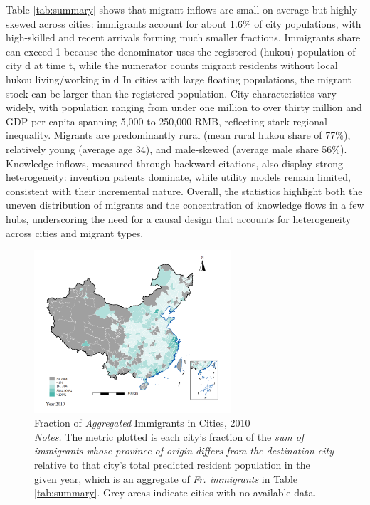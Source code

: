 \documentclass[12pt]{article}
\begin{document}
Table \ref{tab:summary} shows that migrant inflows are small on average but highly skewed across cities: immigrants account for about 1.6\% of city populations, with high-skilled and recent arrivals forming much smaller fractions. 
Immigrants share can exceed 1 because the denominator uses the registered (hukou) population of city d at time t, while the numerator counts migrant residents without local hukou living/working in d In cities with large floating populations, the migrant stock can be larger than the registered population.
City characteristics vary widely, with population ranging from under one million to over thirty million and GDP per capita spanning 5,000 to 250,000 RMB, reflecting stark regional inequality. Migrants are predominantly rural (mean rural hukou share of 77\%), relatively young (average age 34), and male-skewed (average male share 56\%). Knowledge inflows, measured through backward citations, also display strong heterogeneity: invention patents dominate, while utility models remain limited, consistent with their incremental nature. Overall, the statistics highlight both the uneven distribution of migrants and the concentration of knowledge flows in a few hubs, underscoring the need for a causal design that accounts for heterogeneity across cities and migrant types.

\begin{figure}[!htbp]
 \centering
 \includegraphics[width=0.65\textwidth]{../Analysis/output/figure_immgrants_share_2010.png}
 \caption{Fraction of \emph{Aggregated} Immigrants in Cities, 2010 \vspace{1ex} \\ 
   {\footnotesize \emph{Notes.} The metric plotted is each city's fraction of the \emph{sum of immigrants whose province of origin differs from the destination city} relative to that city's total predicted resident population in the given year, which is an aggregate of \emph{Fr. immigrants} in Table \ref{tab:summary}. Grey areas indicate cities with no available data.}}
 \label{fig:2010}
\end{figure}
\end{document}
